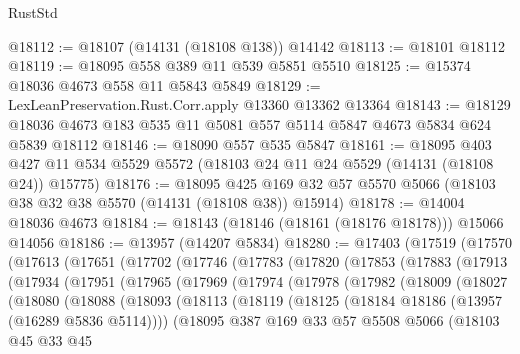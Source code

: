 \begin{lexlean}{RustStd}
\begin{coremodule}
@18112 := @18107 (@14131 (@18108 @138)) @14142
@18113 := @18101 @18112
@18119 := @18095 @558 @389 @11 @539 @5851 @5510
@18125 := @15374 @18036 @4673 @558 @11 @5843 @5849
@18129 := LexLeanPreservation.Rust.Corr.apply @13360 @13362 @13364
@18143 := @18129 @18036 @4673 @183 @535 @11 @5081 @557 @5114 @5847 @4673 @5834 @624 @5839 @18112
@18146 := @18090 @557 @535 @5847
@18161 := @18095
    @403
    @427
    @11
    @534
    @5529
    @5572
    (@18103 @24 @11 @24 @5529 (@14131 (@18108 @24)) @15775)
@18176 := @18095
    @425
    @169
    @32
    @57
    @5570
    @5066
    (@18103 @38 @32 @38 @5570 (@14131 (@18108 @38)) @15914)
@18178 := @14004 @18036 @4673
@18184 := @18143 (@18146 (@18161 (@18176 @18178))) @15066 @14056
@18186 := @13957 (@14207 @5834)
@18280 := @17403
    (@17519
      (@17570
        (@17613
          (@17651
            (@17702
              (@17746
                (@17783
                  (@17820
                    (@17853
                      (@17883
                        (@17913
                          (@17934
                            (@17951
                              (@17965
                                (@17969
                                  (@17974
                                    (@17978
                                      (@17982
                                        (@18009
                                          (@18027
                                            (@18080
                                              (@18088
                                                (@18093
                                                  (@18113
                                                    (@18119
                                                      (@18125
                                                        (@18184
                                                          @18186
                                                          (@13957 (@16289 @5836 @5114))))
                                                      (@18095
                                                        @387
                                                        @169
                                                        @33
                                                        @57
                                                        @5508
                                                        @5066
                                                        (@18103
                                                          @45
                                                          @33
                                                          @45

\end{coremodule}
\end{lexlean}
